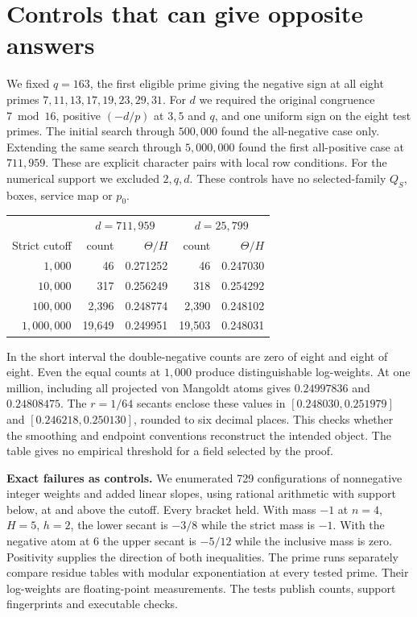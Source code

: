 \documentclass[12pt,letterpaper]{article}
\newcommand{\para}[1]{\par\medskip\noindent\textbf{#1}\quad}
\newcommand{\pagepart}[1]{\clearpage\section{#1}}
\begin{document}
\pagepart{Controls that can give opposite answers}
We fixed \(q=163\), the first eligible prime giving the negative sign at all eight primes \(7,11,13,17,19,23,29,31\). For \(d\) we required the original congruence \(7\bmod16\), positive \((-d/p)\) at \(3,5\) and \(q\), and one uniform sign on the eight test primes. The initial search through \(500{,}000\) found the all-negative case only. Extending the same search through \(5{,}000{,}000\) found the first all-positive case at \(711{,}959\). These are explicit character pairs with local row conditions. For the numerical support we excluded \(2,q,d\). These controls have no selected-family \(Q_S\), boxes, service map or \(p_0\).

\begin{center}\begin{tabular}{@{}r rr rr@{}}
\toprule
& \multicolumn{2}{c}{\(d=711{,}959\)} & \multicolumn{2}{c}{\(d=25{,}799\)}\\
Strict cutoff & count & \(\Theta/H\) & count & \(\Theta/H\)\\\midrule
\(1{,}000\)&46&0.271252&46&0.247030\\
\(10{,}000\)&317&0.256249&318&0.254292\\
\(100{,}000\)&2,396&0.248774&2,390&0.248102\\
\(1{,}000{,}000\)&19,649&0.249951&19,503&0.248031\\\bottomrule
\end{tabular}\end{center}
In the short interval the double-negative counts are zero of eight and eight of eight. Even the equal counts at \(1{,}000\) produce distinguishable log-weights. At one million, including all projected von Mangoldt atoms gives \(0.24997836\) and \(0.24808475\). The \(r=1/64\) secants enclose these values in \([0.248030,0.251979]\) and \([0.246218,0.250130]\), rounded to six decimal places. This checks whether the smoothing and endpoint conventions reconstruct the intended object. The table gives no empirical threshold for a field selected by the proof.

\para{Exact failures as controls.} We enumerated 729 configurations of nonnegative integer weights and added linear slopes, using rational arithmetic with support below, at and above the cutoff. Every bracket held. With mass \(-1\) at \(n=4\), \(H=5\), \(h=2\), the lower secant is \(-3/8\) while the strict mass is \(-1\). With the negative atom at 6 the upper secant is \(-5/12\) while the inclusive mass is zero. Positivity supplies the direction of both inequalities. The prime runs separately compare residue tables with modular exponentiation at every tested prime. Their log-weights are floating-point measurements. The tests publish counts, support fingerprints and executable checks.
\end{document}
